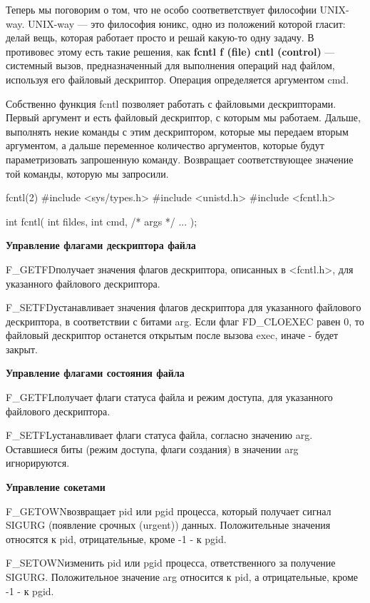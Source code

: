 Теперь мы поговорим о том, что не особо соответветствует философии UNIX-way. UNIX-way --- это философия юникс, одно из положений которой гласит: делай вещь, которая работает просто и решай какую-то одну задачу. В противовес этому есть такие решения, как \textbf{fcntl f (file) cntl (control)} --- системный вызов, предназначенный для выполнения операций над файлом, используя его файловый дескриптор. Операция определяется аргументом cmd.

Собственно функция fcntl позволяет работать с файловыми дескрипторами. Первый аргумент и есть файловый дескриптор, с которым мы работаем. Дальше, выполнять некие команды с этим дескриптором, которые мы передаем вторым аргументом, а дальше переменное количество аргументов, которые будут параметризовать запрошенную команду. Возвращает соответствующее значение той команды, которую мы запросили.

\begin{CCode}{fcntl(2)}
	#include <sys/types.h>
	#include <unistd.h>
	#include <fcntl.h>

	int fcntl(
		int fildes, 
		int cmd, /* args */ ... 
	); \end{CCode}

\textbf{Управление флагами дескриптора файла}

\begin{myenv}{F\_GETFD}{получает значения флагов дескриптора, описанных в <fcntl.h>, для указанного файлового дескриптора.}
\end{myenv}

\begin{myenv}{F\_SETFD}{устанавливает значения флагов дескриптора для указанного файлового дескриптора, в соответствии с битами arg. Если флаг FD\_CLOEXEC равен 0, то файловый дескриптор останется открытым после вызова exec, иначе - будет закрыт.}
\end{myenv}
	
\textbf{Управление флагами состояния файла}

\begin{myenv}{F\_GETFL}{получает флаги статуса файла и режим доступа, для указанного файлового дескриптора.}
\end{myenv}

\begin{myenv}{F\_SETFL}{устанавливает флаги статуса файла, согласно значению arg. Оставшиеся биты (режим доступа, флаги создания) в значении arg игнорируются.}
\end{myenv}

\textbf{Управление сокетами}

\begin{myenv}{F\_GETOWN}{возвращает pid или pgid процесса, который получает сигнал SIGURG (появление срочных (urgent)) данных. Положительные значения относятся к pid, отрицательные, кроме -1 - к pgid.}
\end{myenv} 

\begin{myenv}{F\_SETOWN}{изменить pid или pgid процесса, ответственного за получение SIGURG. Положительное значение arg относится к pid, а отрицательные, кроме -1 - к pgid.}
\end{myenv}
